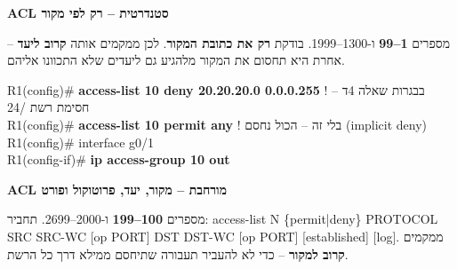 \documentclass[11pt]{article}
\newcommand{\enLR}[1]{\textenglish{#1}}
\newcommand{\code}[1]{\textenglish{\codefont #1}}
\newcommand{\subheading}[1]{\vskip6pt{\bfseries\color{h3}#1\par}\vskip2pt}
\begin{document}
\subheading{\enLR{ACL} סטנדרטית – רק לפי מקור}

מספרים \textbf{\enLR{1}–\enLR{99}} ו-\enLR{1300}–\enLR{1999.} בודקת \textbf{רק את כתובת המקור}. לכן ממקמים אותה \textbf{קרוב ליעד} – אחרת היא תחסום את המקור מלהגיע גם ליעדים שלא התכוונו אליהם.\par

\begin{codebox}\begin{english}\codefont\footnotesize\color{cfg}\setlength{\parindent}{0pt}
R1(config)\# \textcolor{cbold}{\textbf{access-list 10 deny 20.20.20.0 0.0.0.255}}    \textcolor{ccom}{\texthebrew{! בבגרות שאלה \enLR{4}ד – חסימת רשת /\enLR{24}}}\\
R1(config)\# \textcolor{cbold}{\textbf{access-list 10 permit any}}                 \textcolor{ccom}{\texthebrew{! בלי זה – הכול נחסם \enLR{(implicit deny)}}}\\
R1(config)\# interface g0/1\\
R1(config-if)\# \textcolor{cbold}{\textbf{ip access-group 10 out}}
\end{english}\end{codebox}

\subheading{\enLR{ACL} מורחבת – מקור, יעד, פרוטוקול ופורט}

מספרים \textbf{\enLR{100}–\enLR{199}} ו-\enLR{2000}–\enLR{2699.} תחביר: \code{access-list N \{permit|deny\} PROTOCOL SRC SRC-WC [op PORT] DST DST-WC [op PORT] [established] [log]}. ממקמים \textbf{קרוב למקור} – כדי לא להעביר תעבורה שתיחסם ממילא דרך כל הרשת.\par
\end{document}
